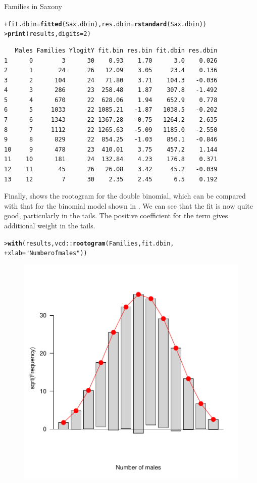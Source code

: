 \documentclass[10pt,krantz2]{krantz}\usepackage[]{graphicx}\usepackage[]{color}
\makeatletter
\newcommand{\hlnum}[1]{\textcolor[rgb]{0.686,0.059,0.569}{#1}}%
\newcommand{\hlstr}[1]{\textcolor[rgb]{0.192,0.494,0.8}{#1}}%
\newcommand{\hlopt}[1]{\textcolor[rgb]{0,0,0}{#1}}%
\newcommand{\hlstd}[1]{\textcolor[rgb]{0.345,0.345,0.345}{#1}}%
\newcommand{\hlkwc}[1]{\textcolor[rgb]{0.333,0.667,0.333}{#1}}%
\newcommand{\hlkwd}[1]{\textcolor[rgb]{0.737,0.353,0.396}{\textbf{#1}}}%
\newenvironment{kframe}{%
 \def\at@end@of@kframe{}%
 \ifinner\ifhmode%
  \def\at@end@of@kframe{\end{minipage}}%
  \begin{minipage}{\columnwidth}%
 \fi\fi%
 \def\FrameCommand##1{\hskip\@totalleftmargin \hskip-\fboxsep
 \colorbox{shadecolor}{##1}\hskip-\fboxsep
     \hskip-\linewidth \hskip-\@totalleftmargin \hskip\columnwidth}%
 \MakeFramed {\advance\hsize-\width
   \@totalleftmargin\z@ \linewidth\hsize
   \@setminipage}}%
 {\par\unskip\endMakeFramed%
 \at@end@of@kframe}
\newenvironment{knitrout}{}{} %
\renewenvironment{knitrout}{\small\renewcommand{\baselinestretch}{.85}}{} %
\makeatother
\begin{document}
\begin{Example}[saxony2]{Families in Saxony}
\begin{knitrout}
\begin{kframe}
\begin{alltt}
\hlstd{+ }          \hlkwc{fit.dbin}\hlstd{=}\hlkwd{fitted}\hlstd{(Sax.dbin),} \hlkwc{res.dbin}\hlstd{=}\hlkwd{rstandard}\hlstd{(Sax.dbin))}
\hlstd{> }\hlkwd{print}\hlstd{(results,} \hlkwc{digits}\hlstd{=}\hlnum{2}\hlstd{)}
\end{alltt}
\begin{verbatim}
   Males Families YlogitY fit.bin res.bin fit.dbin res.dbin
1      0        3      30    0.93    1.70      3.0    0.026
2      1       24      26   12.09    3.05     23.4    0.136
3      2      104      24   71.80    3.71    104.3   -0.036
4      3      286      23  258.48    1.87    307.8   -1.492
5      4      670      22  628.06    1.94    652.9    0.778
6      5     1033      22 1085.21   -1.87   1038.5   -0.202
7      6     1343      22 1367.28   -0.75   1264.2    2.635
8      7     1112      22 1265.63   -5.09   1185.0   -2.550
9      8      829      22  854.25   -1.03    850.1   -0.846
10     9      478      23  410.01    3.75    457.2    1.144
11    10      181      24  132.84    4.23    176.8    0.371
12    11       45      26   26.08    3.42     45.2   -0.039
13    12        7      30    2.35    2.45      6.5    0.192
\end{verbatim}
\end{kframe}
\end{knitrout}
Finally,  shows the rootogram for the double
binomial, which can be compared with that for the binomial model
shown in .  We can see that the fit is now
quite good, particularly in the tails.  The positive coefficient
for the term  gives additional weight in the tails.
\begin{knitrout}
\color{fgcolor}\begin{kframe}
\begin{alltt}
\hlstd{> }\hlkwd{with}\hlstd{(results, vcd}\hlopt{::}\hlkwd{rootogram}\hlstd{(Families, fit.dbin,}
\hlstd{+ }                        \hlkwc{xlab}\hlstd{=}\hlstr{"Number of males"}\hlstd{))}
\end{alltt}
\end{kframe}\begin{figure}[!htbp]

\centerline{\includegraphics[width=.6\textwidth]{ch03/fig/sax-glm5-1} }


\end{figure}
\end{knitrout}
\end{Example}
\end{document}
